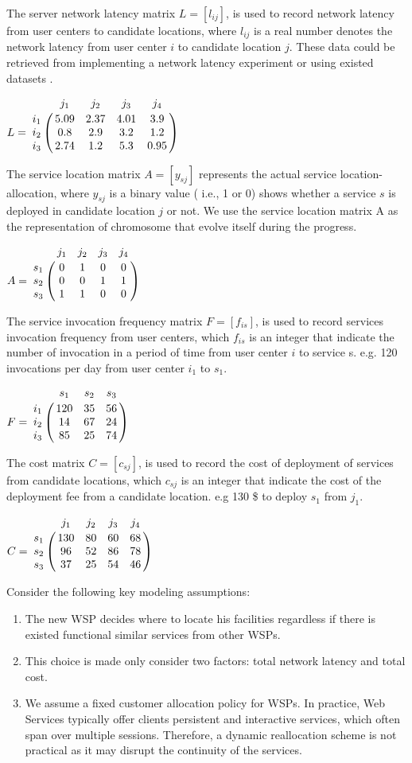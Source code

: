 \documentclass[twoside]{article}
\let\bbordermatrix\bordermatrix
\begin{document}
The server network latency matrix $L = [l_{ij}]$, is used to record network latency from user centers to 
candidate locations, where $l_{ij}$ is a real number denotes the network latency from user center $i$ to candidate 
location $j$. 
These data could be retrieved from implementing a network latency experiment or using existed datasets \cite{5552800, 6076756}.
\begin{center}
$
L = \bbordermatrix{~ & j_{1} & j_{2} & j_{3} & j_{4} \cr
					i_{1}	&5.09 &2.37 &4.01	&3.9	\cr
					i_{2}	&0.8  &2.9 &3.2	&1.2 \cr
					i_{3}	&2.74 &1.2 &5.3	&0.95 \cr} 
$
\end{center}
The service location matrix $A = [y_{sj}]$ represents the actual service location-allocation, where $y_{sj}$  is a binary value ( i.e., 1 or 0) shows whether a service $s$ is deployed in candidate location $j$ or not.
We use the service location matrix A as the representation of chromosome that evolve itself during the progress.
\begin{center}
$
A = \bbordermatrix{~ & j_{1} & j_{2} & j_{3} & j_{4} \cr
					s_{1}	&0 &1 &0	&0	\cr
					s_{2}	&0  &0 &1	&1 \cr
					s_{3}	&1 &1 &0	&0 \cr} 
$
\end{center}

The service invocation frequency matrix $F= [f_{is}]$, is used to record services invocation frequency from user centers, which $f_{is}$ is an integer that indicate the number of invocation in a period of time from user center $i$ to service s. e.g. 120 invocations per day from user center $i_{1}$ to $s_{1}$.
\begin{center}
$
F = \bbordermatrix{~ & s_{1} & s_{2} & s_{3}  \cr
					i_{1}	&120 &35 &56	\cr
					i_{2}	&14  &67 &24 \cr
					i_{3}	&85 &25 &74 \cr} 
$
\end{center}

The cost matrix $C = [c_{sj}]$, is used to record the cost of deployment of services from candidate locations, 
which $c_{sj}$ is an integer that indicate the cost of the deployment fee from a candidate location. 
e.g 130 \$ to deploy $s_{1}$ from $j_{1}$.
\begin{center}
$
C = \bbordermatrix{~ & j_{1} & j_{2} & j_{3} & j_{4} \cr
					s_{1}	&130 &80 &60	&68	\cr
					s_{2}	&96  &52 &86	&78 \cr
					s_{3}	&37 &25 &54	&46 \cr} 
$
\end{center}

Consider the following key modeling assumptions:
\begin{enumerate}
	\item The new WSP decides where to locate his facilities regardless if there is existed functional similar services from other WSPs.
	\item This choice is made only consider two factors: total network latency and total cost.
	\item We assume a fixed customer allocation policy for WSPs. In practice, Web Services typically offer clients persistent and interactive services, which often span over multiple sessions. Therefore, a dynamic reallocation scheme is not practical as it may disrupt the continuity of the services.
\end{enumerate}
\end{document}
